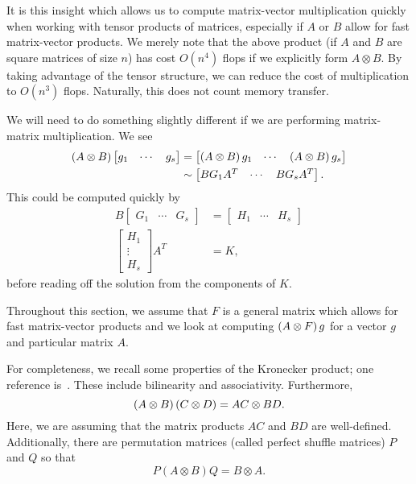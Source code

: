 \noindent
It is this insight which allows us to compute matrix-vector multiplication
quickly when working with
tensor products of matrices, especially if
$A$ or $B$ allow for fast matrix-vector products.
We merely note that the above product (if $A$ and $B$ are square
matrices of size $n$) has cost $O(n^{4})$ flops if we explicitly
form $A\otimes B$.
By taking advantage of the tensor structure,
we can reduce the cost of multiplication to $O(n^{3})$ flops.
Naturally, this does not count memory transfer.

We will need to do something slightly different if we are performing
matrix-matrix multiplication. We see
%
\begin{align}
    \left( A\otimes B \right)\begin{bmatrix} g_{1} & \cdots & g_{s} \end{bmatrix}
    &= \begin{bmatrix} \left( A\otimes B \right)g_{1} & \cdots
        & \left( A\otimes B \right)g_{s} \end{bmatrix} \nonumber\\
    &\sim \begin{bmatrix} BG_{1}A^{T} & \cdots & BG_{s}A^{T} \end{bmatrix}.
\end{align}
%
This could be computed quickly by
%
\begin{align}
    B\begin{bmatrix} G_{1} & \cdots & G_{s} \end{bmatrix}
    &= \begin{bmatrix} H_{1} & \cdots & H_{s} \end{bmatrix} \nonumber\\
    \begin{bmatrix} H_{1} \\ \vdots \\ H_{s} \end{bmatrix} A^{T}
    &= K,
\end{align}
%
before reading off the solution from the components of $K$.

Throughout this section, we assume that $F$ is a general matrix which
allows for fast matrix-vector products and we look at computing
$\left( A\otimes F \right)g$ for a vector $g$ and particular matrix $A$.

For completeness, we recall some properties of the Kronecker product;
one reference is~\cite{vanLoan2000ubiquitous}.
These include bilinearity and associativity.
Furthermore,
%
\begin{equation}
    \left( A\otimes B \right)\left( C\otimes D \right) = AC\otimes BD.
\end{equation}
%
Here, we are assuming that the matrix products $AC$ and $BD$
are well-defined.
Additionally, there are permutation matrices (called perfect shuffle matrices)
$P$ and $Q$ so that
%
\begin{equation}
    P(A\otimes B)Q = B\otimes A.
\end{equation}



